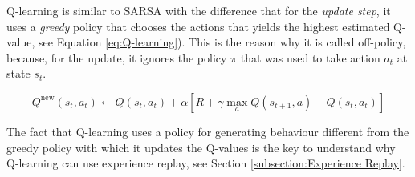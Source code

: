 Q-learning is similar to SARSA with the difference that for the \textit{update step}, it uses a \textit{greedy} policy that chooses the actions that yields the highest estimated Q-value, see Equation \eqref{eq:Q-learning}).  This is the reason why it is called off-policy, because, for the update, it ignores the policy $\pi$ that was used to take action $a_t$ at state $s_t$. 



\begin{equation}
Q^{\text{new}}(s_t, a_t)  \leftarrow Q(s_t, a_t) + \alpha \left[ R  + \gamma {\max_{a} Q(s_{t+1}, a)} - Q(s_t, a_t)\right]
\label{eq:Q-learning}
\end{equation}








The fact that Q-learning uses a policy for generating behaviour different from the greedy policy with which it updates the Q-values is the key to understand why Q-learning can use experience replay, see Section \ref{subsection:Experience Replay}.










